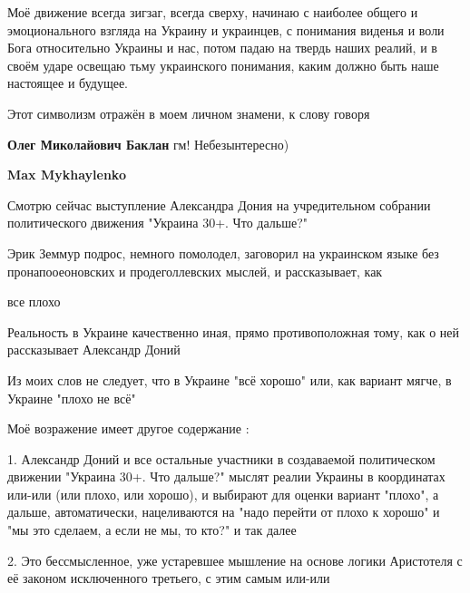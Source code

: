 \begin{itemize}
Моё движение всегда зигзаг, всегда сверху, начинаю с наиболее общего и
эмоционального взгляда на Украину и украинцев, с понимания виденья и воли Бога
относительно Украины и нас, потом падаю на твердь наших реалий, и в своём ударе
освещаю тьму украинского понимания, каким должно быть наше настоящее и будущее.

Этот символизм отражён в моем личном знамени, к слову говоря

\begin{itemize}
 

\textbf{Олег Миколайович Баклан} гм! Небезынтересно)

 
\textbf{Max Mykhaylenko} 

Смотрю сейчас выступление Александра Дония на учредительном собрании
политического движения "Украина 30+. Что дальше?"

Эрик Земмур подрос, немного помолодел, заговорил на украинском языке без
пронапооеоновских и продеголлевских мыслей, и рассказывает, как

все плохо \Smiley[1.0][yellow]

Реальность в Украине качественно иная, прямо противоположная тому, как о ней
рассказывает Александр Доний

Из моих слов не следует, что в Украине "всё хорошо" или, как вариант мягче, в Украине "плохо не всё"

Моё возражение имеет другое содержание :

1. Александр Доний и все остальные участники в создаваемой политическом
движении "Украина 30+. Что дальше?" мыслят реалии Украины в координатах или-или
(или плохо, или хорошо), и выбирают для оценки вариант "плохо", а дальше,
автоматически, нацеливаются на "надо перейти от плохо к хорошо" и "мы это
сделаем, а если не мы, то кто?" и так далее

2. Это бессмысленное, уже устаревшее мышление на основе логики Аристотеля с её законом исключенного третьего, с этим самым или-или


\end{itemize}
\end{itemize}
